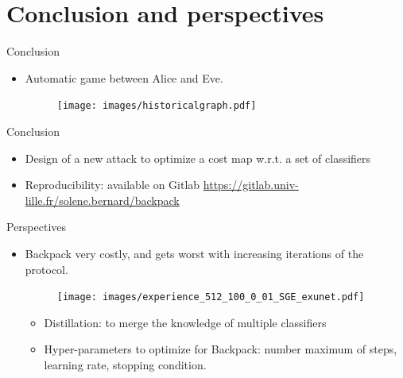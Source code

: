 \documentclass[10pt,aspectratio=169]{beamer}
\begin{document}
\section{Conclusion and perspectives}


\begin{frame}{Conclusion}
    \begin{itemize}
        \item Automatic game between Alice and Eve. 
        \begin{figure}[h]
            \texttt{[image: images/historicalgraph.pdf]}
        \end{figure}
    \end{itemize}

\end{frame}

\begin{frame}{Conclusion}
    
    \begin{itemize}
        \setlength\itemsep{2em}
        \item Design of a new attack to optimize a cost map w.r.t. a set of classifiers
        \pause
        \item Reproducibility: available on Gitlab \url{https://gitlab.univ-lille.fr/solene.bernard/backpack}
    \end{itemize}
\end{frame}


\begin{frame}{Perspectives}
    \begin{itemize}
        \item Backpack very costly, and gets worst with increasing iterations of the protocol. 
        
        \begin{figure}[h]
            \texttt{[image: images/experience\_512\_100\_0\_01\_SGE\_exunet.pdf]}
        \end{figure}

        \pause

        \begin{itemize}
            \item Distillation: to merge the knowledge of multiple classifiers
            \item Hyper-parameters to optimize for Backpack: number maximum of steps, learning rate, stopping condition.
        \end{itemize}

    \end{itemize}

\end{frame}
\end{document}
